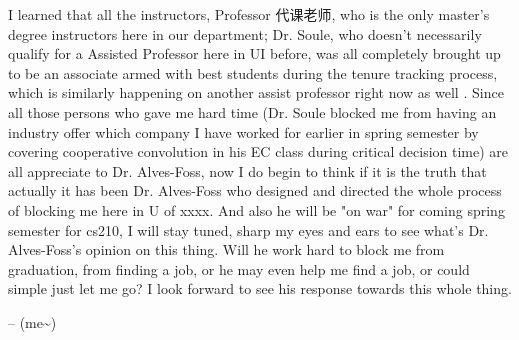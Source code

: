 \documentclass[9pt,b5paper]{article}
\begin{document}
I learned that all the instructors, Professor 代课老师, who is the only master's degree instructors here in our department; Dr. Soule, who doesn't necessarily qualify for a Assisted Professor here in UI before, was all completely brought up to be an associate armed with best students during the tenure tracking process, which is similarly happening on another assist professor right now as well . Since all those persons who gave me hard time (Dr. Soule blocked me from having an industry offer which company I have worked for earlier in spring semester by covering cooperative convolution in his EC class during critical decision time) are all appreciate to Dr. Alves-Foss, now I do begin to think if it is the truth that actually it has been Dr. Alves-Foss who designed and directed the whole process of blocking me here in U of xxxx. And also he will be "on war" for coming spring semester for cs210, I will stay tuned, sharp my eyes and ears to see what's Dr. Alves-Foss's opinion on this thing. Will he work hard to block me from graduation, from finding a job, or he may even help me find a job, or could simple just let me go? I look forward to see his response towards this whole thing. 

-- (me\textasciitilde{})
\end{document}
